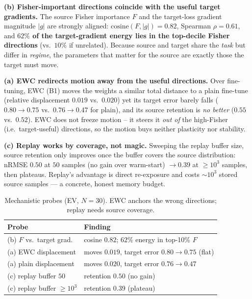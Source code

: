 \documentclass[conference]{IEEEtran}
\begin{document}
\noindent\textbf{(b) Fisher-important directions coincide with the useful target
gradients.} The source Fisher importance $F$ and the target-loss gradient
magnitude $|g|$ are strongly aligned: $\mathrm{cosine}(F,|g|){=}0.82$,
Spearman $\rho{=}0.61$, and \textbf{$62\%$ of the target-gradient energy lies in
the top-decile Fisher directions} (vs.\ $10\%$ if unrelated). Because source and
target share the \emph{task} but differ in \emph{regime}, the parameters that
matter for the source are exactly those the target must move.

\noindent\textbf{(a) EWC redirects motion away from the useful directions.} Over
fine-tuning, EWC (B1) moves the weights a similar total distance to a plain
fine-tune (relative displacement $0.019$ vs.\ $0.020$) yet its target error barely
falls ($0.80\!\to\!0.75$ vs.\ $0.76\!\to\!0.47$ for plain), and its source
retention is \emph{no better} ($0.55$ vs.\ $0.52$). EWC does not freeze motion --
it steers it \emph{out of} the high-Fisher (i.e.\ target-useful) directions, so the
motion buys neither plasticity nor stability.

\noindent\textbf{(c) Replay works by coverage, not magic.} Sweeping the replay
buffer size, source retention only improves once the buffer covers the source
distribution: nRMSE $0.50$ at $50$ samples (no gain over warm-start) $\to 0.39$ at
${\ge}10^3$ samples, then plateaus. Replay's advantage is direct re-exposure and
costs ${\sim}10^3$ stored source samples --- a concrete, honest memory budget.

\begin{table}[t]
\centering
\caption{Mechanistic probes (EV, $N{=}30$). EWC anchors the wrong directions;
replay needs source coverage.}
\label{tab:mech}
\begin{tabular}{ll}
\toprule
Probe & Finding\\
\midrule
(b) $F$ vs.\ target grad. & cosine $0.82$; $62\%$ energy in top-10\% $F$\\
(a) EWC displacement      & moves $0.019$, target error $0.80{\to}0.75$ (flat)\\
(a) plain displacement    & moves $0.020$, target error $0.76{\to}0.47$\\
(c) replay buffer $50$    & retention $0.50$ (no gain)\\
(c) replay buffer ${\ge}10^3$ & retention $0.39$ (plateau)\\
\bottomrule
\end{tabular}
\end{table}
\end{document}
